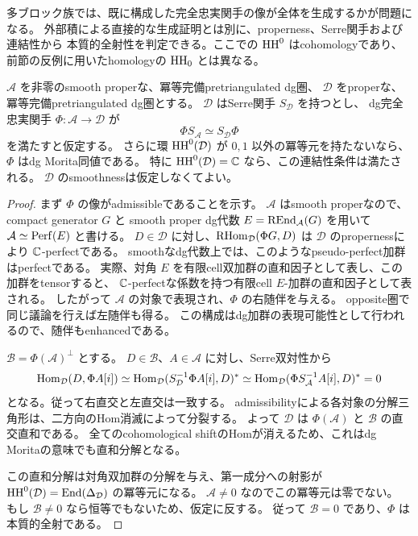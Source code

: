 多ブロック族では、既に構成した完全忠実関手の像が全体を生成するかが問題になる。
外部積による直接的な生成証明とは別に、properness、Serre関手および連結性から
本質的全射性を判定できる。ここでの \(\operatorname{HH}^0\) はcohomologyであり、
前節の反例に用いたhomologyの \(\operatorname{HH}_0\) とは異なる。

\begin{proposition}[Serreと連結性による全生成判定]
\label{prop:serre-connected-generation}
 \(\mathcal A\) を非零のsmooth properな、冪等完備pretriangulated dg圏、
 \(\mathcal D\) をproperな、冪等完備pretriangulated dg圏とする。
 \(\mathcal D\) はSerre関手 \(S_{\mathcal D}\) を持つとし、
 dg完全忠実関手 \(\Phi:\mathcal A\to\mathcal D\) が
 \[
 \Phi S_{\mathcal A}\simeq S_{\mathcal D}\Phi
 \]
 を満たすと仮定する。
 さらに環 \(\operatorname{HH}^0(\mathcal D)\) が \(0,1\) 以外の冪等元を持たないなら、
 \(\Phi\) はdg Morita同値である。
 特に \(\operatorname{HH}^0(\mathcal D)=\mathbb C\) なら、この連結性条件は満たされる。
 \(\mathcal D\) のsmoothnessは仮定しなくてよい。
\end{proposition}
\begin{proof}
 まず \(\Phi\) の像がadmissibleであることを示す。
 \(\mathcal A\) はsmooth properなので、compact generator \(G\) と
 smooth proper dg代数 \(E=\operatorname{REnd}_{\mathcal A}(G)\) を用いて
 \(\mathcal A\simeq\operatorname{Perf}(E)\) と書ける。
 \(D\in\mathcal D\) に対し、\(\operatorname{RHom}_{\mathcal D}(\Phi G,D)\) は
 \(\mathcal D\) のpropernessにより \(\mathbb C\)-perfectである。
 smoothなdg代数上では、このようなpseudo-perfect加群はperfectである。
 実際、対角 \(E\) を有限cell双加群の直和因子として表し、この加群をtensorすると、
 \(\mathbb C\)-perfectな係数を持つ有限cell \(E\)-加群の直和因子として表される。
 したがって \(\mathcal A\) の対象で表現され、\(\Phi\) の右随伴を与える。
 opposite圏で同じ議論を行えば左随伴も得る。
 この構成はdg加群の表現可能性として行われるので、随伴もenhancedである。

 \(\mathcal B=\Phi(\mathcal A)^\perp\) とする。
 \(D\in\mathcal B\)、\(A\in\mathcal A\) に対し、Serre双対性から
 \[
 \operatorname{Hom}_{\mathcal D}(D,\Phi A[i])
 \simeq
 \operatorname{Hom}_{\mathcal D}(S_{\mathcal D}^{-1}\Phi A[i],D)^*
 \simeq
 \operatorname{Hom}_{\mathcal D}(\Phi S_{\mathcal A}^{-1}A[i],D)^*=0
 \]
 となる。従って右直交と左直交は一致する。
 admissibilityによる各対象の分解三角形は、二方向のHom消滅によって分裂する。
 よって \(\mathcal D\) は \(\Phi(\mathcal A)\) と \(\mathcal B\) の直交直和である。
 全てのcohomological shiftのHomが消えるため、これはdg Moritaの意味でも直和分解となる。

 この直和分解は対角双加群の分解を与え、第一成分への射影が
 \(\operatorname{HH}^0(\mathcal D)=\operatorname{End}(\Delta_{\mathcal D})\) の冪等元になる。
 \(\mathcal A\ne0\) なのでこの冪等元は零でない。
 もし \(\mathcal B\ne0\) なら恒等でもないため、仮定に反する。
 従って \(\mathcal B=0\) であり、\(\Phi\) は本質的全射である。
\end{proof}

